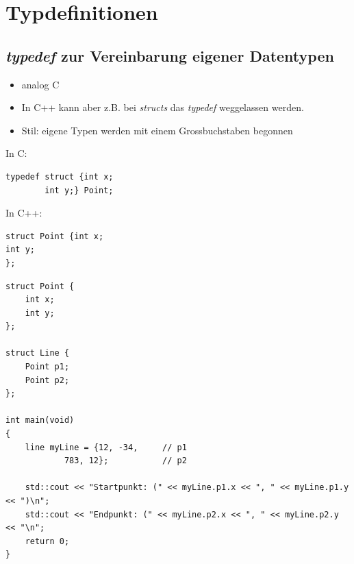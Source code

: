 \section{Typdefinitionen}

\subsection{\emph{typedef} zur Vereinbarung eigener Datentypen\hfill}
\begin{minipage}{0.6\linewidth}
\begin{itemize}
	\item analog C
	\item In C++ kann aber z.B. bei \emph{structs} das \emph{typedef} weggelassen werden.
	\item Stil: eigene Typen werden mit einem Grossbuchstaben begonnen
\end{itemize}
\end{minipage}
\hspace{0.05\linewidth}
\begin{minipage}{0.3\linewidth}
In C:
\vspace{-\baselineskip}
\begin{lstlisting}
typedef struct {int x;
		int y;} Point;
\end{lstlisting}
In C++:
\vspace{-\baselineskip}
\begin{lstlisting}
struct Point {int x;
int y;
};
\end{lstlisting}
\end{minipage}

\begin{minipage}{\linewidth}
\begin{lstlisting}
struct Point {
	int x;
	int y;
};

struct Line {
	Point p1;
	Point p2;
};

int main(void)
{
	line myLine = {12, -34,		// p1
			783, 12};			// p2
		
	std::cout << "Startpunkt: (" << myLine.p1.x << ", " << myLine.p1.y << ")\n";
	std::cout << "Endpunkt: (" << myLine.p2.x << ", " << myLine.p2.y << "\n";
	return 0;
}
\end{lstlisting}
\end{minipage}

